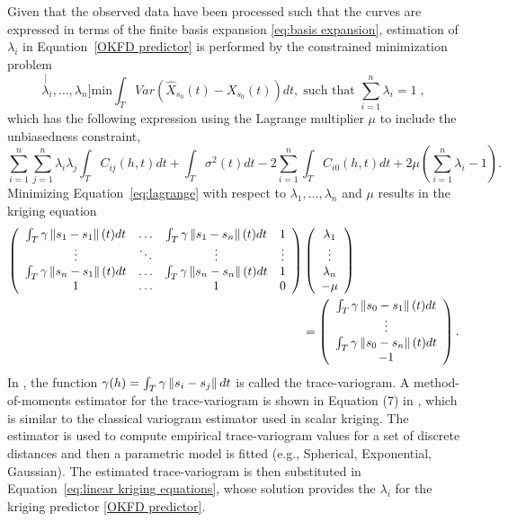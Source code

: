 Given that the observed data have been processed such that the curves are expressed in terms of the finite basis expansion \eqref{eq:basis expansion}, estimation of $\lambda_i$ in Equation~\eqref{OKFD predictor} is performed by the constrained minimization problem
\begin{equation}
	\stackrel[\lambda_i,\dots, \lambda_n]{\mbox{min}}{}\int_TVar(\widehat{X}_{s_0}(t) - X_{s_0}(t))dt, \; \mbox{such that }\sum_{i=1}^{n}\lambda_i=1 \;,
\end{equation}
which has the following expression using the Lagrange multiplier $\mu$ to include the unbiasedness constraint,
\begin{equation}\label{eq:lagrange}
	\sum_{i=1}^n\sum_{j=1}^n\lambda_i\lambda_j\int_T C_{ij}(h,t)dt + \int_T \sigma^2(t)dt - 2\sum_{i=1}^n\int_TC_{i0}(h,t)dt + 2\mu\left( \sum_{i=1}^n\lambda_i - 1\right).
\end{equation}
Minimizing Equation~\eqref{eq:lagrange} with respect to $\lambda_1, \dots, \lambda_n$ and $\mu$ results in the kriging equation
\begin{align}\label{eq:linear kriging equations}
	\left( 
	\begin{array}{cccc}
		\int_T\gamma\left\|s_1 - s_1\right\|(t)dt & \dots & 	\int_T\gamma\left\|s_1 - s_n\right\|(t)dt & 1\\
		\vdots & \ddots & \vdots & \vdots \\
		\int_T\gamma\left\|s_n - s_1\right\|(t)dt & \dots & \int_T\gamma\left\|s_n - s_n\right\|(t)dt & 1 \\
		1 & \dots & 1 & 0 \\
	\end{array}
	\right)&
	\left(
	\begin{array}{c}
		\lambda_1 \\
		\vdots \\
		\lambda_n \\
		-\mu
	\end{array}
	\right) \notag \\
	&=
	\left(
	\begin{array}{c}
		\int_T\gamma\left\|s_0 - s_1\right\|(t)dt \\
		\vdots \\
	\int_T\gamma\left\|s_0 - s_n\right\|(t)dt \\
		-1
	\end{array}
	\right).
\end{align}
In \cite{Giraldo:2010jx}, the function $\gamma(h)= \int_T\gamma\left\|s_i - s_j\right\|dt$ is called the trace-variogram. A method-of-moments estimator for the trace-variogram is shown in Equation (7) in \cite{Giraldo:2010jx}, which is similar to the classical variogram estimator used in scalar kriging. The estimator is used to compute empirical trace-variogram values for a set of discrete distances and then a parametric model is fitted (e.g., Spherical, Exponential, Gaussian). The estimated trace-variogram is then substituted in Equation~\eqref{eq:linear kriging equations}, whose solution provides the $\lambda_i$ for the kriging predictor \eqref{OKFD predictor}. 

